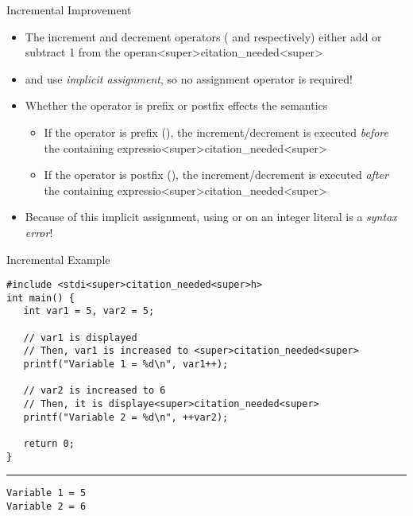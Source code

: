 \documentclass[11pt]{beamer}
\let\OldTexttt\texttt
\renewcommand{\texttt}[1]{\OldTexttt{\color{teal}{#1}}}
\begin{document}
\begin{frame}{Incremental Improvement}
\begin{itemize}
\item The increment and decrement operators (\texttt{++} and \texttt{--} respectively) either add or subtract 1 from the operan<super>citation_needed<super>  
\item \texttt{++} and \texttt{--} use \textit{implicit assignment}, so no assignment operator is required!
\item Whether the operator is prefix or postfix effects the semantics  
\begin{itemize}
\item If the operator is prefix (\texttt{++x}), the increment/decrement is executed \emph{before} the containing expressio<super>citation_needed<super>
\item If the operator is postfix (\texttt{x--}), the increment/decrement is executed \emph{after} the containing expressio<super>citation_needed<super>
\end{itemize}
\item Because of this implicit assignment, using \texttt{++} or \texttt{--} on an integer literal is a \emph{syntax error}!
\end{itemize}
\end{frame}

\begin{frame}[fragile=singleslide]{Incremental Example}
\begin{lstlisting}[style=C]
#include <stdi<super>citation_needed<super>h>
int main() {
   int var1 = 5, var2 = 5;

   // var1 is displayed
   // Then, var1 is increased to <super>citation_needed<super>
   printf("Variable 1 = %d\n", var1++);

   // var2 is increased to 6 
   // Then, it is displaye<super>citation_needed<super>
   printf("Variable 2 = %d\n", ++var2);

   return 0;
}
\end{lstlisting}
\hrule
\begin{verbatim}
Variable 1 = 5
Variable 2 = 6
\end{verbatim}
\end{frame}
\end{document}
